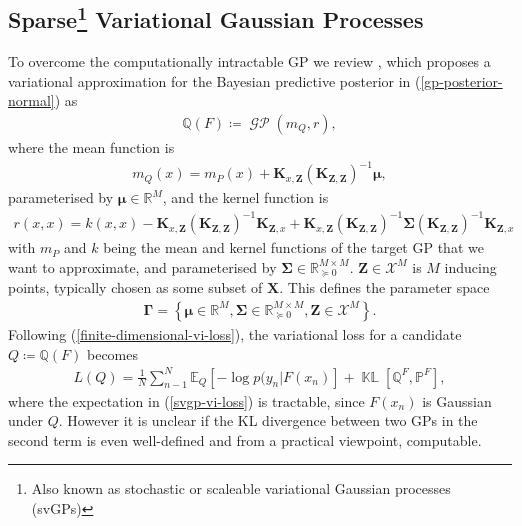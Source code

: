\documentclass{article}
\newcommand{\KLD}{\operatorname{\mathbb{KL}}}
\newcommand{\GP}{\operatorname{\mathcal{GP}}}
\numberwithin{equation}{section}
\begin{document}
\subsection[Sparse Variational Gaussian Processes]{Sparse\footnote{Also known as stochastic or scaleable variational Gaussian processes (svGPs)} Variational Gaussian Processes}\label{section:svgp}
To overcome the computationally intractable GP we review \cite{titsias2009variational}, which proposes a variational approximation for the Bayesian predictive posterior in (\ref{gp-posterior-normal}) as
\begin{align}
    \mathbb{Q}(F) \coloneqq \GP(m_Q, r),
\end{align}
where the mean function is
\begin{align}
    \label{svgp-mean}
    m_Q(x) = m_P(x) + \mathbf{K}_{x, \mathbf{Z}}\left(\mathbf{K}_{\mathbf{Z}, \mathbf{Z}}\right)^{-1} \boldsymbol{\mu},
\end{align}
parameterised by $\boldsymbol{\mu} \in \mathbb{R}^M$, and the kernel function is
\begin{align}
r(x, x) = k(x, x) - \mathbf{K}_{x, \mathbf{Z}}\left(\mathbf{K}_{\mathbf{Z}, \mathbf{Z}}\right)^{-1} \mathbf{K}_{\mathbf{Z}, x} + \mathbf{K}_{x, \mathbf{Z}}\left(\mathbf{K}_{\mathbf{Z}, \mathbf{Z}}\right)^{-1}\mathbf{\Sigma}\left(\mathbf{K}_{\mathbf{Z}, \mathbf{Z}}\right)^{-1} \mathbf{K}_{\mathbf{Z}, x}
\label{svgp-covariance}
\end{align}
with $m_P$ and $k$ being the mean and kernel functions of the target GP that we want to approximate, and parameterised by $\mathbf{\Sigma} \in \mathbb{R}^{M\times M}_{\succcurlyeq 0}$.
$\mathbf{Z} \in \mathcal{X}^M$ is $M$ inducing points, typically chosen as some subset of $\mathbf{X}$.
This defines the parameter space
\begin{align}
    \mathbf{\Gamma} = \left\{\boldsymbol{\mu} \in \mathbb{R}^{M}, \mathbf{\Sigma} \in \mathbb{R}^{M\times M}_{\succcurlyeq 0}, \mathbf{Z} \in \mathcal{X}^M \right\}.
    \label{svgp-parameter-space}
\end{align}
Following (\ref{finite-dimensional-vi-loss}), the variational loss for a candidate $Q \coloneqq \mathbb{Q}(F)$ becomes
\begin{align}
L(Q) = \frac{1}{N}\sum_{n-1}^N \mathbb{E}_Q \left[-\log p(y_n \vert F(x_n)\right] + \KLD\left[\mathbb{Q}^F, \mathbb{P}^F\right],
\label{svgp-vi-loss}
\end{align}
where the expectation in (\ref{svgp-vi-loss}) is tractable, since $F(x_n)$ is Gaussian under $Q$.
However it is unclear if the KL divergence between two GPs in the second term is even well-defined and from a practical viewpoint, computable.
\end{document}
